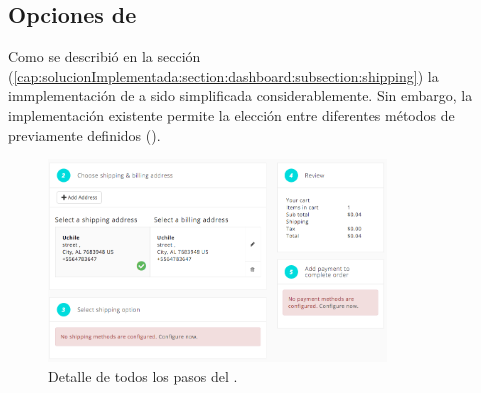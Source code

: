 \subsection{Opciones de \ShippingCOM}\label{chapter:solucionimplementada:section:shipping_options}

	Como se describió en la sección (\ref{cap:solucionImplementada:section:dashboard:subsection:shipping}) la immplementación de \ShippingCOM a sido simplificada considerablemente. Sin embargo, la implementación existente permite la elección entre diferentes métodos de \ShippingCOM previamente definidos (). 

	\begin{figure}[!h]
		\centering
		\includegraphics[width=0.8\textwidth]{figuras/shipping/steps.png}
		\caption{Detalle de todos los pasos del \workflowCPT \shippingEF.}
		\label{figure:shipping:checkout:select_option}
	\end{figure}